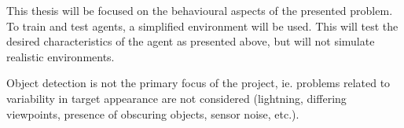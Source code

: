 This thesis will be focused on the behavioural aspects of the presented problem. To train and test agents, a simplified environment will be used. This will test the desired characteristics of the agent as presented above, but will not simulate realistic environments.

Object detection is not the primary focus of the project, ie. problems related to variability in target appearance are not considered (lightning, differing viewpoints, presence of obscuring objects, sensor noise, etc.).



